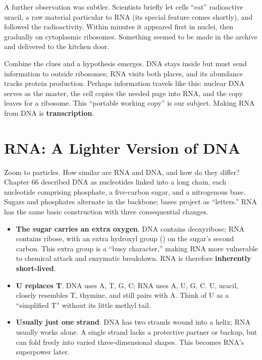 A further observation was subtler. Scientists briefly let cells ``eat'' radioactive uracil, a raw material particular to RNA (its special feature comes shortly), and followed the radioactivity. Within minutes it appeared first in nuclei, then gradually on cytoplasmic ribosomes. Something seemed to be made in the archive and delivered to the kitchen door.

Combine the clues and a hypothesis emerges. DNA stays inside but must send information to outside ribosomes; RNA visits both places, and its abundance tracks protein production. Perhaps information travels like this: nuclear DNA serves as the master, the cell copies the needed page into RNA, and the copy leaves for a ribosome. This ``portable working copy'' is our subject. Making RNA from DNA is \textbf{transcription}.

\section{RNA: A Lighter Version of DNA}

Zoom to particles. How similar are RNA and DNA, and how do they differ? Chapter 66 described DNA as nucleotides linked into a long chain, each nucleotide comprising phosphate, a five-carbon sugar, and a nitrogenous base. Sugars and phosphates alternate in the backbone; bases project as ``letters.'' RNA has the same basic construction with three consequential changes.

\begin{itemize}[itemsep=2pt]
\item \textbf{The sugar carries an extra oxygen}. DNA contains deoxyribose; RNA contains ribose, with an extra hydroxyl group () on the sugar's second carbon. This extra group is a ``busy character,'' making RNA more vulnerable to chemical attack and enzymatic breakdown. RNA is therefore \textbf{inherently short-lived}.
\item \textbf{U replaces T}. DNA uses A, T, G, C; RNA uses A, U, G, C. U, uracil, closely resembles T, thymine, and still pairs with A. Think of U as a ``simplified T'' without its little methyl tail.
\item \textbf{Usually just one strand}. DNA has two strands wound into a helix; RNA usually works alone. A single strand lacks a protective partner or backup, but can fold freely into varied three-dimensional shapes. This becomes RNA's superpower later.
\end{itemize}

